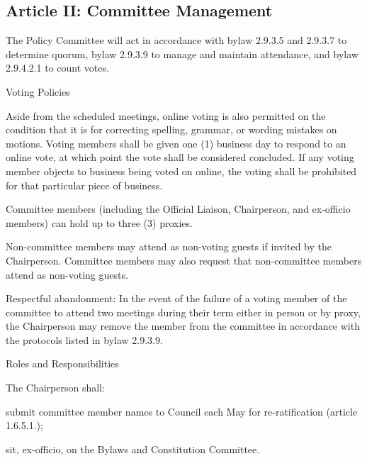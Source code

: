 \subsection{Article II: Committee Management}
\begin{longenum}[ label*=\thesubsection.\arabic*., align=left] 	
\item The Policy Committee will act in accordance with bylaw 2.9.3.5 and 2.9.3.7 to determine quorum, bylaw 2.9.3.9 to manage and maintain attendance, and bylaw 2.9.4.2.1 to count votes.
\item Voting Policies
	\begin{longenum}[label*=\arabic*., align=left]	
	\item Aside from the scheduled meetings, online voting is also permitted on the condition that it is for correcting spelling, grammar, or wording mistakes on motions. Voting members shall be given one (1) business day to respond to an online vote, at which point the vote shall be considered concluded. If any voting member objects to business being voted on online, the voting shall be prohibited for that particular piece of business.
	\item Committee members (including the Official Liaison, Chairperson, and ex-officio members) can hold up to three (3) proxies.
	\end{longenum}
\item Non-committee members may attend as non-voting guests if invited by the Chairperson. Committee members may also request that non-committee members attend as non-voting guests.
\item Respectful abandonment: In the event of the failure of a voting member of the committee to attend two meetings during their term either in person or by proxy, the Chairperson may remove the member from the committee in accordance with the protocols listed in bylaw 2.9.3.9.
\item Roles and Responsibilities
	\begin{longenum}[label*=\arabic*., align=left]	
	\item The Chairperson shall:
		\begin{longenum}[label*=\arabic*., align=left]	
		\item submit committee member names to Council each May for re-ratification (article 1.6.5.1.);
		\item sit, ex-officio, on the Bylaws and Constitution Committee.
		\end{longenum}
	\end{longenum}
\end{longenum}

